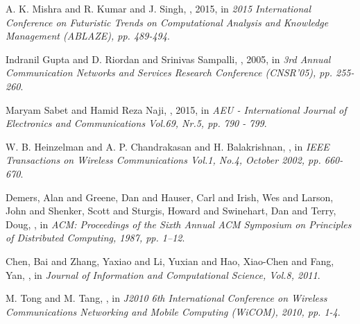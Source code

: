\documentclass[USenglish]{uit-thesis}
\begin{document}
\begin{thebibliography}{9}
A. K. Mishra and R. Kumar and J. Singh,
, 2015,
\newblock in {\em 2015 International Conference on Futuristic Trends on Computational Analysis and Knowledge Management (ABLAZE), pp. 489-494}.

Indranil Gupta and D. Riordan and Srinivas Sampalli,
, 2005,
\newblock in {\em 3rd Annual Communication Networks and Services Research Conference (CNSR'05), pp. 255-260}.

Maryam Sabet and Hamid Reza Naji,
, 2015,
\newblock in {\em AEU - International Journal of Electronics and Communications Vol.69, Nr.5, pp. 790 - 799}.


W. B. Heinzelman and A. P. Chandrakasan and H. Balakrishnan,
,
\newblock in {\em IEEE Transactions on Wireless Communications Vol.1, No.4, October 2002, pp. 660-670}.

Demers, Alan and Greene, Dan and Hauser, Carl and Irish, Wes and Larson, John and Shenker, Scott and Sturgis, Howard and Swinehart, Dan and Terry, Doug,
,
\newblock in {\em ACM: Proceedings of the Sixth Annual ACM Symposium on Principles of Distributed Computing, 1987, pp. 1--12}.

Chen, Bai and Zhang, Yaxiao and Li, Yuxian and Hao, Xiao-Chen and Fang, Yan,
,
\newblock in {\em Journal of Information and Computational Science, Vol.8, 2011}.

M. Tong and M. Tang,
,
\newblock in {\em J2010 6th International Conference on Wireless Communications Networking and Mobile Computing (WiCOM), 2010, pp. 1-4}.


\end{thebibliography}
\end{document}
